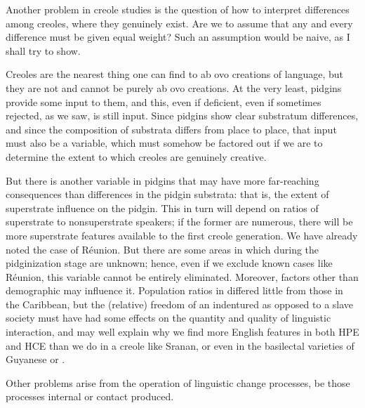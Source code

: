 Another problem in creole studies is the question of how to interpret differences among creoles, where they genuinely exist. Are we to assume that any and every difference must be given equal weight? Such an assumption would be naive, as I shall try to show.

Creoles are the nearest thing one can find to ab ovo creations of language, but they are not and cannot be purely ab ovo creations. At the very least, pidgins provide some input to them, and this, even if deficient, even if sometimes rejected, as we saw, is still input. Since pidgins show clear substratum differences, and since the composition of substrata differs from place to place, that input must also be a variable, which must somehow be factored out if we are to determine the extent to which creoles are genuinely creative.


But there is another variable in pidgins that may have more far-reaching consequences than differences in the pidgin substrata: that is, the extent of superstrate influence on the pidgin. This in turn will depend on ratios of superstrate to nonsuperstrate speakers; if the former are numerous, there will be more superstrate features avail\-able to the first creole generation. We have already noted the case of Réunion. But there are some areas in which  during the pidginization stage are unknown; hence, even if we exclude known cases like Réunion, this variable cannot be entirely eliminated. More\-over, factors other than demographic may influence it. Population ratios in  differed little from those in the Caribbean, but the (relative) freedom of an indentured as opposed to a slave society must have had some effects on the quantity and quality of linguistic inter\-action, and may well explain why we find more English features in both HPE and HCE than we do in a creole like Sranan, or even in the basilectal varieties of Guyanese or .

Other problems arise from the operation of linguistic change processes, be those processes internal or contact produced.

